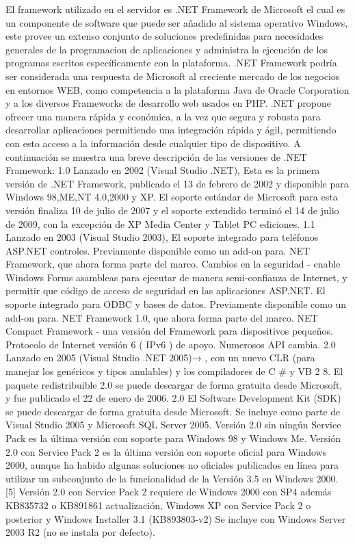 El framework utilizado en el servidor es .NET Framework de Microsoft el cual es un componente de software que puede ser añadido al sistema operativo Windows, este provee un extenso conjunto de soluciones predefinidas para necesidades generales de la programacion de aplicaciones y administra la ejecución de los programas escritos específicamente con la plataforma.
.NET Framework podría ser considerada una respuesta de Microsoft al creciente mercado de los negocios en entornos WEB, como competencia a la plataforma Java de Oracle Corporation y a los diversos Frameworks de desarrollo web usados en PHP. .NET propone ofrecer una manera rápida y económica, a la vez que segura y robusta para desarrollar aplicaciones permitiendo una integración rápida y ágil, permitiendo con esto acceso a la información desde cualquier tipo de dispositivo.
A continuación se muestra una breve descripción de las versiones de .NET Framework:
1.0
Lanzado en 2002 (Visual Studio .NET), Esta es la primera versión de .NET Framework, publicado el 13 de febrero de 2002 y disponible para Windows 98,ME,NT 4.0,2000 y XP. El soporte estándar de Microsoft para esta versión finaliza 10 de julio de 2007 y el soporte extendido terminó el 14 de julio de 2009, con la excepción de XP Media Center y Tablet PC ediciones. 
1.1
Lanzado en 2003 (Visual Studio 2003), El soporte integrado para teléfonos ASP.NET controles. Previamente disponible como un add-on para. NET Framework, que ahora forma parte del marco. Cambios en la seguridad - enable Windows Forms asambleas para ejecutar de manera semi-confianza de Internet, y permitir que código de acceso de seguridad en las aplicaciones ASP.NET. El soporte integrado para ODBC y bases de datos. Previamente disponible como un add-on para. NET Framework 1.0, que ahora forma parte del marco. NET Compact Framework - una versión del Framework para dispositivos pequeños. Protocolo de Internet versión 6 ( IPv6 ) de apoyo. Numerosos API cambia.
2.0
Lanzado en 2005 (Visual Studio .NET 2005)→ , con un nuevo CLR (para manejar los genéricos y tipos anulables) y los compiladores de C # y VB 2 8.
El paquete redistribuible 2.0 se puede descargar de forma gratuita desde Microsoft, y fue publicado el 22 de enero de 2006. 2.0 El Software Development Kit (SDK) se puede descargar de forma gratuita desde Microsoft. Se incluye como parte de Visual Studio 2005 y Microsoft SQL Server 2005. Versión 2.0 sin ningún Service Pack es la última versión con soporte para Windows 98 y Windows Me. Versión 2.0 con Service Pack 2 es la última versión con soporte oficial para Windows 2000, aunque ha habido algunas soluciones no oficiales publicados en línea para utilizar un subconjunto de la funcionalidad de la Versión 3.5 en Windows 2000. [5] Versión 2.0 con Service Pack 2 requiere de Windows 2000 con SP4 además KB835732 o KB891861 actualización, Windows XP con Service Pack 2 o posterior y Windows Installer 3.1 (KB893803-v2) Se incluye con Windows Server 2003 R2 (no se instala por defecto).

